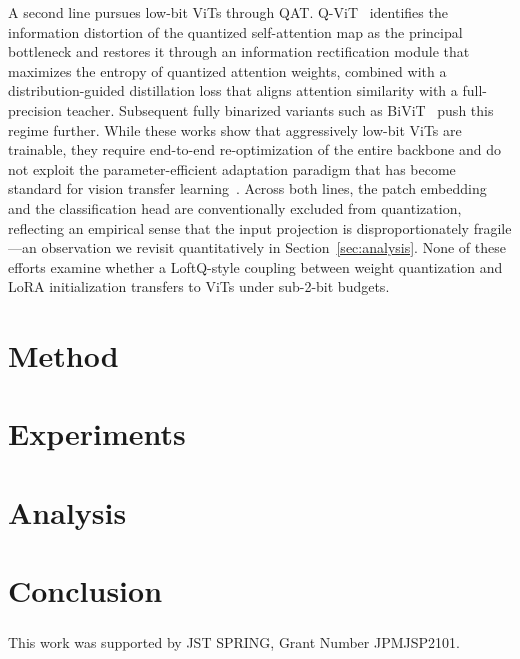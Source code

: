 \documentclass[runningheads]{llncs}
\begin{document}
A second line pursues low-bit \acp{ViT} through \ac{QAT}.
Q-ViT~\cite{NEURIPS2022_deb921bf} identifies the information distortion of the quantized self-attention map as the principal bottleneck and restores it through an information rectification module that maximizes the entropy of quantized attention weights,
combined with a distribution-guided distillation loss that aligns attention similarity with a full-precision teacher.
Subsequent fully binarized variants such as BiViT~\cite{He_2023_ICCV} push this regime further.
While these works show that aggressively low-bit \acp{ViT} are trainable,
they require end-to-end re-optimization of the entire backbone and do not exploit the parameter-efficient adaptation paradigm that has become standard for vision transfer learning~\cite{10.1007/978-3-031-19827-4_41,NEURIPS2022_69e2f49a}.
Across both lines, the patch embedding and the classification head are conventionally excluded from quantization, reflecting an empirical sense that the input projection is disproportionately fragile---an observation we revisit quantitatively in Section~\ref{sec:analysis}.
None of these efforts examine whether a LoftQ-style coupling between weight quantization and LoRA initialization transfers to \acp{ViT} under sub-2-bit budgets.
\section{Method}

\section{Experiments}

\section{Analysis}

\section{Conclusion}

%
%
\begin{credits}
\subsubsection{\ackname}
This work was supported by JST SPRING, Grant Number JPMJSP2101.
\end{credits}
%
%
%


\end{document}
